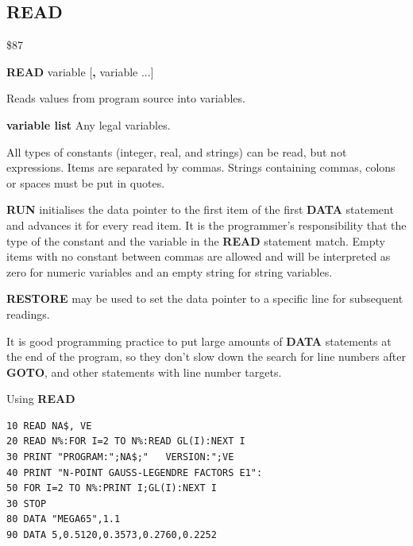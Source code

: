 \subsection{READ}
\begin{description}[leftmargin=2cm,style=nextline]
\item [Token:] \$87
\item [Format:] {\bf READ} variable [{\bf,} variable ...]
\item [Usage:]  Reads values from program source into variables.

               {\bf variable list} Any legal variables.

               All types of constants (integer, real, and
               strings) can be read, but not expressions.
               Items are separated by commas.
               Strings containing commas, colons or spaces must be put
               in quotes.

               {\bf RUN} initialises the data pointer
               to the first item of the first {\bf DATA} statement
               and advances it for every read item. It is the
               programmer's responsibility that the type of
               the constant and the variable in the {\bf READ}
               statement match. Empty items with no constant
               between commas are allowed and will be interpreted as
               zero for numeric variables and an empty string for
               string variables.

               {\bf RESTORE} may be used to set the
               data pointer to a specific line for subsequent
               readings.

\item [Remarks:] It is good programming practice to put large amounts of
                 {\bf DATA} statements at the end of the program,
                 so they don't slow down the search for line numbers
                 after {\bf GOTO}, and other statements with line number targets.

\item [Example:] Using {\bf READ}
\begin{tcolorbox}[colback=black,coltext=white]
\verbatimfont{\codefont}
\begin{verbatim}
10 READ NA$, VE
20 READ N%:FOR I=2 TO N%:READ GL(I):NEXT I
30 PRINT "PROGRAM:";NA$;"   VERSION:";VE
40 PRINT "N-POINT GAUSS-LEGENDRE FACTORS E1":
50 FOR I=2 TO N%:PRINT I;GL(I):NEXT I
30 STOP
80 DATA "MEGA65",1.1
90 DATA 5,0.5120,0.3573,0.2760,0.2252
\end{verbatim}
\end{tcolorbox}
\end{description}

